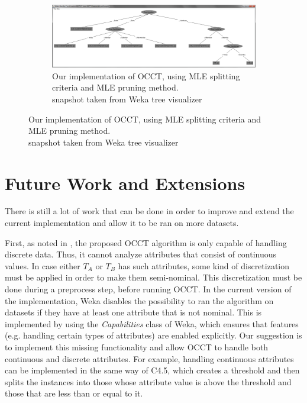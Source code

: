 \documentclass[a4paper,12pt]{article}
\begin{document}
\begin{spacing}{1.5}
\begin{figure}[!h]
\begin{subfigure}[!h]{1\textwidth}
  \centering
  \includegraphics[width=1\textwidth]{Figures/Eval/TreeOutwP}
  \caption{Our implementation of OCCT, using MLE splitting criteria and MLE pruning method.\\ snapshot taken from Weka tree visualizer}
\end{subfigure}
\end{figure}


\section{Future Work and Extensions}

There is still a lot of work that can be done in order to improve and extend the current implementation and allow it to be ran on more datasets.

First, as noted in \cite{dror2011thesis}, the proposed OCCT algorithm is only capable of handling discrete data. Thus, it cannot analyze attributes that consist of continuous values. In case either $T_A$ or $T_B$ has such attributes, some kind of discretization must be applied in order to make them semi-nominal. This discretization must be done during a preprocess step, before running OCCT. In the current version of the implementation, Weka disables the possibility to ran the algorithm on datasets if they have at least one attribute that is not nominal. This is implemented by using the {\em Capabilities} class of Weka, which ensures that features (e.g. handling certain types of attributes) are enabled explicitly. Our suggestion is to implement this missing functionality and allow OCCT to handle both continuous and discrete attributes. For example, handling continuous attributes can be implemented in the same way of C4.5, which creates a threshold and then splits the instances into those whose attribute value is above the threshold and those that are less than or equal to it.


\end{spacing}
\end{document}
